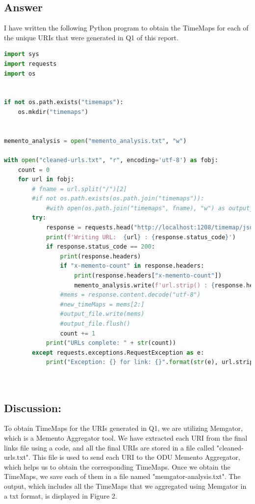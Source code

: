 \documentclass[12pt]{article}
\begin{document}
\subsection*{Answer}
I have written the following Python program to obtain the TimeMaps for each of the unique URIs that were generated in Q1 of this report.

\begin{lstlisting}[language=Python, caption=Getting TimeMap for each URIs, label=lst:copy]
import sys
import requests
import os


if not os.path.exists("timemaps"):
    os.mkdir("timemaps")


memento_analysis = open("memento_analysis.txt", "w")

with open("cleaned-urls.txt", "r", encoding='utf-8') as fobj:
    count = 0
    for url in fobj:
        # fname = url.split("/")[2]
        #if not os.path.exists(os.path.join("timemaps")):
            #with open(os.path.join("timemaps", fname), "w") as output_file:
        try:
            response = requests.head("http://localhost:1208/timemap/json/" + url.strip())
            print(f'Writing URL:  {url} : {response.status_code}')
            if response.status_code == 200:
                print(response.headers)
                if "x-memento-count" in response.headers:
                    print(response.headers["x-memento-count"])
                    memento_analysis.write(f'url.strip() : {response.headers["x-memento-count"]}\n')
                #mems = response.content.decode("utf-8")
                #new_timeMaps = mems[2:]
                #output_file.write(mems)
                #output_file.flush()
                count += 1
            print("URLs complete: " + str(count))
        except requests.exceptions.RequestException as e:
            print("Exception: {} for link: {}".format(str(e), url.strip()))

        
\end{lstlisting}

\subsection*{Discussion:}
To obtain TimeMaps for the URIs generated in Q1, we are utilizing Memgator, which is a Memento Aggregator tool. We have extracted each URI from the final links file using a code, and all the final URIs are stored in a file called "cleaned-urls.txt". This file is used to send each URI to the ODU Memento Aggregator, which helps us to obtain the corresponding TimeMaps. Once we obtain the TimeMaps, we save each of them in a file named "memgator-analysis.txt". The output, which includes all the TimeMaps that we aggregated using Memgator in a txt format, is displayed in Figure 2.
\end{document}
